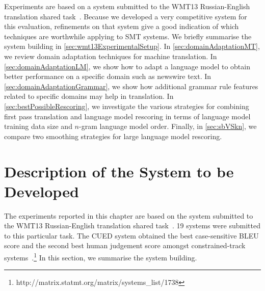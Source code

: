 Experiments are based on a system submitted to the WMT13
Russian-English translation shared
task~\citep{pino-waite-xiao-degispert-flego-byrne:2013:WMT}.
Because we developed a very competitive system for this evaluation,
refinements on that system give a good indication of which techniques
are worthwhile applying to SMT systems.
We briefly summarise the system building in
\autoref{sec:wmt13ExperimentalSetup}.
In \autoref{sec:domainAdaptationMT}, we review domain adaptation
techniques for machine translation. In \autoref{sec:domainAdaptationLM},
we show how to adapt a language model to obtain better performance
on a specific domain such as newswire text.
In \autoref{sec:domainAdaptationGrammar}, we show how additional
grammar rule features related to specific domains may help in translation.
In \autoref{sec:bestPossibleRescoring}, we investigate
the various strategies for combining first pass translation
and language model rescoring in terms of language model
training data size and $n$-gram language model order.
Finally, in \autoref{sec:sbVSkn}, we compare two smoothing
strategies for large language model rescoring.

\section{Description of the System to be Developed}
\label{sec:wmt13ExperimentalSetup}

The experiments reported in this chapter are based
on the system submitted to the WMT13 Russian-English translation shared
task~\citep{pino-waite-xiao-degispert-flego-byrne:2013:WMT}.
19 systems were submitted to this particular task. The
CUED system obtained the best case-sensitive BLEU
score and the second best human judgement score
amongst constrained-track
systems~\citep{bojar-buck-callisonburch-federmann-haddow-koehn-monz-post-soricut-specia:2013:WMT}.\footnote{http://matrix.statmt.org/matrix/systems\_list/1738}
In this section, we summarise the system building.

